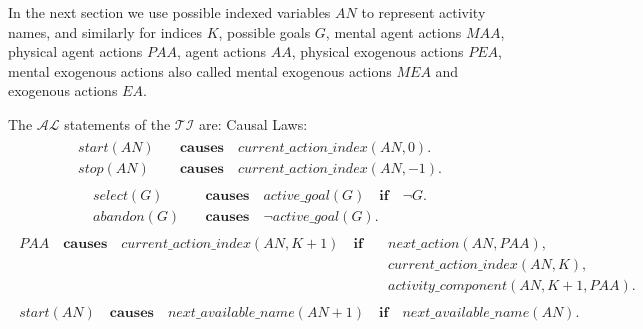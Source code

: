 \documentclass[11pt, oneside]{article}
\begin{document}
In the next section we use possible indexed variables $AN$ to represent activity names, and similarly for indices $K$, possible goals $G$, mental agent actions $MAA$, physical agent actions $PAA$,
agent actions $AA$, physical exogenous actions $PEA$, mental exogenous actions also called mental exogenous actions $MEA$ and exogenous actions $EA$.

The $\mathcal{AL}$ statements of the $\mathcal{TI}$ are:\newline
Causal Laws:
\begin{align}\begin{split}
 start(AN)\quad &\mathbf{causes} \quad current\_action\_index(AN, 0). \\
 stop(AN)\quad &\mathbf{causes} \quad current\_action\_index(AN, -1). 
\end{split}\end{align}
\begin{align}\begin{split}
select(G)\quad &\mathbf{causes} \quad active\_goal(G) \quad \mathbf{if} \quad \neg G. \\
abandon(G)\quad &\mathbf{causes} \quad \neg active\_goal(G). 
\end{split}\end{align}
\begin{align}\begin{split}
PAA\quad \mathbf{causes} \quad current\_action\_index(AN, K+1)\quad \mathbf{if}\quad &next\_action(AN, PAA), \\
&current\_action\_index(AN, K),\\
&activity\_component(AN, K+1, PAA).
\end{split}\end{align}
\begin{align}\begin{split}
start(AN) \quad \mathbf{causes} \quad next\_available\_name(AN+1) \quad \mathbf{if}\quad next\_available\_name(AN). 
\end{split}\end{align}
\end{document}
